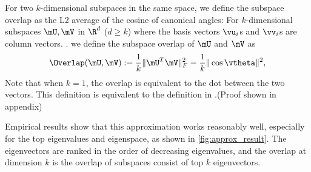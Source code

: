 For two $k$-dimensional subspaces in the same space,
we define the subspace overlap as the L2 average of the cosine of canonical angles: For $k$-dimensional subspaces $\mU,\mV$ in $\R^d$ ($d\geq k$) where the basis vectors $\vu_i$s and $\vv_i$s are column vectors. . we define the subspace overlap of $\mU$ and $\mV$ as
\begin{equation}
    \Overlap(\mU, \mV) := \frac{1}{k}\|\mU^T\mV\|^2_F =\frac{1}{k}\|\cos\vtheta\|^2,
    \label{eqn:overlap}
\end{equation}
Note that when $k=1$, the overlap is equivalent to the dot between the two vectors. This definition is equivalent to the definition in \citet{gur2018gradient}.(Proof shown in appendix)

Empirical results show that this approximation works reasonably well, especially for the top eigenvalues and eigenspace, as shown in \cref{fig:approx_result}. The eigenvectors are ranked in the order of decreasing eigenvalues, and the overlap at dimension $k$ is the overlap of subspaces consist of top $k$ eigenvectors. 


